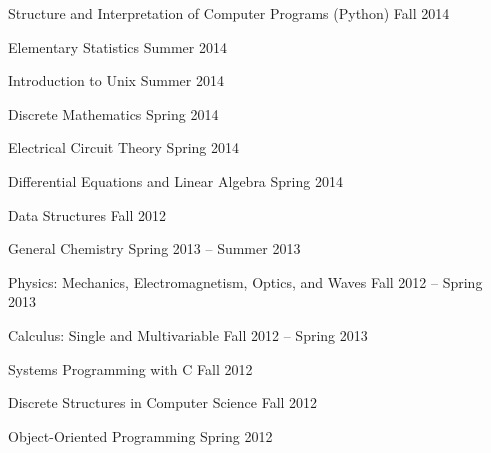 \documentclass[letterpaper,MMMyyyy,nonstopmode]{simpleresumecv}
\begin{document}
\begin{Body}
\BulletItem
Structure and Interpretation of Computer Programs (Python)
\hfill Fall 2014

\BigGap

\BulletItem
Elementary Statistics
\hfill Summer 2014

\BulletItem
Introduction to Unix
\hfill Summer 2014

\BulletItem
Discrete Mathematics
\hfill Spring 2014

\BulletItem
Electrical Circuit Theory
\hfill Spring 2014

\BulletItem
Differential Equations and Linear Algebra
\hfill Spring 2014

\BulletItem
Data Structures
\hfill Fall 2012

\BigGap

\BulletItem
General Chemistry
\hfill Spring 2013 -- Summer 2013

\BulletItem
Physics: Mechanics, Electromagnetism, Optics, and Waves
\hfill Fall 2012 -- Spring 2013

\BulletItem
Calculus: Single and Multivariable
\hfill Fall 2012 -- Spring 2013

\BulletItem
Systems Programming with C
\hfill Fall 2012

\BulletItem
Discrete Structures in Computer Science
\hfill Fall 2012

\BulletItem
Object-Oriented Programming
\hfill Spring 2012

\end{Body}
\end{document}
